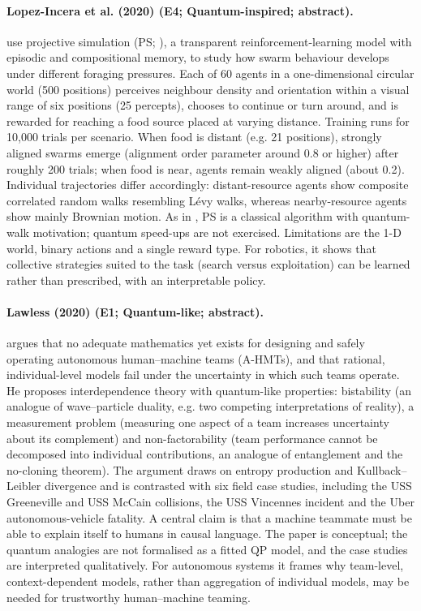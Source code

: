 \documentclass[10pt,a4paper]{article}
\begin{document}
\paragraph{Lopez-Incera et al. (2020) (E4; Quantum-inspired; abstract).} \citet{LopezIncera2020} use projective simulation (PS; \citep{Briegel2012}), a transparent reinforcement-learning model with episodic and compositional memory, to study how swarm behaviour develops under different foraging pressures. Each of 60 agents in a one-dimensional circular world (500 positions) perceives neighbour density and orientation within a visual range of six positions (25 percepts), chooses to continue or turn around, and is rewarded for reaching a food source placed at varying distance. Training runs for 10,000 trials per scenario. When food is distant (e.g. 21 positions), strongly aligned swarms emerge (alignment order parameter around 0.8 or higher) after roughly 200 trials; when food is near, agents remain weakly aligned (about 0.2). Individual trajectories differ accordingly: distant-resource agents show composite correlated random walks resembling Lévy walks, whereas nearby-resource agents show mainly Brownian motion. As in \citep{Ried2019}, PS is a classical algorithm with quantum-walk motivation; quantum speed-ups are not exercised. Limitations are the 1-D world, binary actions and a single reward type. For robotics, it shows that collective strategies suited to the task (search versus exploitation) can be learned rather than prescribed, with an interpretable policy.

\paragraph{Lawless (2020) (E1; Quantum-like; abstract).} \citet{Lawless2020} argues that no adequate mathematics yet exists for designing and safely operating autonomous human--machine teams (A-HMTs), and that rational, individual-level models fail under the uncertainty in which such teams operate. He proposes interdependence theory with quantum-like properties: bistability (an analogue of wave--particle duality, e.g. two competing interpretations of reality), a measurement problem (measuring one aspect of a team increases uncertainty about its complement) and non-factorability (team performance cannot be decomposed into individual contributions, an analogue of entanglement and the no-cloning theorem). The argument draws on entropy production and Kullback--Leibler divergence and is contrasted with six field case studies, including the USS Greeneville and USS McCain collisions, the USS Vincennes incident and the Uber autonomous-vehicle fatality. A central claim is that a machine teammate must be able to explain itself to humans in causal language. The paper is conceptual; the quantum analogies are not formalised as a fitted QP model, and the case studies are interpreted qualitatively. For autonomous systems it frames why team-level, context-dependent models, rather than aggregation of individual models, may be needed for trustworthy human--machine teaming.
\end{document}
